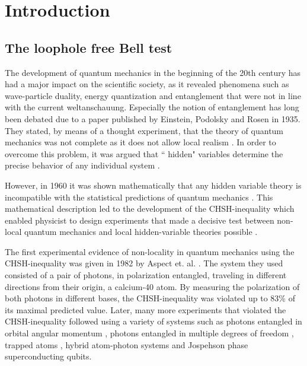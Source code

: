 \color{tudelft-cyan}
\chapter{Introduction}
\color{black}


\label{intro}

\color{tudelft-cyan}
\section{The loophole free Bell test}
\color{black}
The development of quantum mechanics in the beginning of the 20th century has had a major impact on the scientific society, as it revealed phenomena such as wave-particle duality, energy quantization and entanglement that were not in line with the current weltanschauung. Especially the notion of entanglement has long been debated due to a paper published by Einstein, Podolsky and Rosen in 1935. They stated, by means of a thought experiment, that the theory of quantum mechanics was not complete as it does not allow local realism \cite{einstein1935can}. In order to overcome this problem, it was argued that `` hidden" variables determine the precise behavior of any individual system \cite{bohm1952suggested,bohm1952suggested2}.

However, in 1960 it was shown mathematically that any hidden variable theory is incompatible with the statistical predictions of quantum mechanics \cite{bell1964on}. This mathematical description led to the development of the CHSH-inequality which enabled physicist to design experiments that made a decisive test between non-local quantum mechanics  and local hidden-variable theories possible \cite{clauser1969proposed}.

The first experimental evidence of non-locality in quantum mechanics using the CHSH-inequality was given in 1982 by Aspect et. al. \cite{ aspect1982experimental, aspect1982experimental2}. The system they used consisted of a pair of photons, in polarization entangled, traveling in different directions from their origin, a calcium-40 atom. By measuring the polarization of both photons in different bases, the CHSH-inequality was violated up to 83\% of its maximal predicted value. Later, many more experiments that violated the CHSH-inequality followed using a variety of systems such as photons entangled in orbital angular momentum \cite{mair2001entanglement}, photons entangled in multiple degrees of freedom \cite{barreiro2005generation}, trapped atoms \cite{rowe2001experimental}, hybrid atom-photon systems \cite{blinov2004observation} and Jospehson phase superconducting qubits. \cite{ansmann2009violation}

